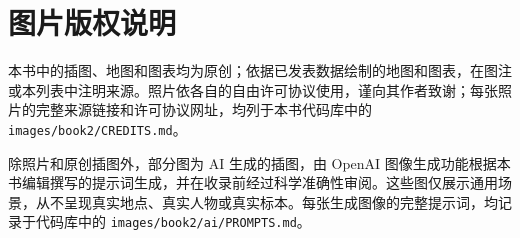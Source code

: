 \chapter*{图片版权说明}

本书中的插图、地图和图表均为原创；依据已发表数据绘制的地图和图表，在图注或本列表中注明来源。照片依各自的自由许可协议使用，谨向其作者致谢；每张照片的完整来源链接和许可协议网址，均列于本书代码库中的 \texttt{images/book2/CREDITS.md}。

\bigskip
除照片和原创插图外，部分图为 AI 生成的插图，由 OpenAI 图像生成功能根据本书编辑撰写的提示词生成，并在收录前经过科学准确性审阅。这些图仅展示通用场景，从不呈现真实地点、真实人物或真实标本。每张生成图像的完整提示词，均记录于代码库中的 \texttt{images/book2/ai/PROMPTS.md}。

